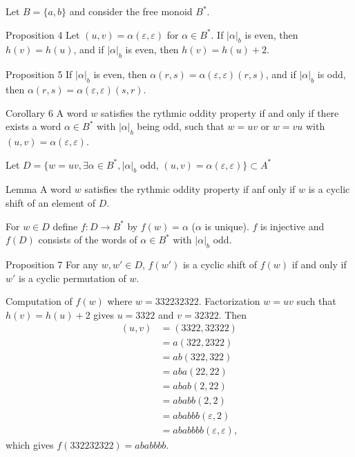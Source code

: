 \documentclass{beamer}
\theoremstyle{definition}
\begin{document}
\begin{frame}
Let $B=\{a,b\}$ and consider the free monoid $B^*$. 

\begin{block}{Proposition 4}
Let $(u,v)=\alpha(\varepsilon,\varepsilon)$ for $\alpha\in B^*$. If $|\alpha|_b$ is even, then $h(v)=h(u)$, and if $|\alpha|_b$ is even, then $h(v)=h(u)+2$. 
\end{block}
\begin{block}{Proposition 5}
If $|\alpha|_b$ is even, then $\alpha(r,s)=\alpha(\varepsilon,\varepsilon)(r,s)$, and if $|\alpha|_b$ is odd, then $\alpha(r,s)=\alpha(\varepsilon,\varepsilon)(s,r)$.
\end{block}

{
\begin{block}{Corollary 6}
A word $w$ satisfies the rythmic oddity property if and only if there exists a word $\alpha\in B^*$ with $|\alpha|_b$ being odd, such that $w=uv$ or $w=vu$ with $(u,v)=\alpha(\varepsilon,\varepsilon)$.
\end{block}
}
\end{frame}
\begin{frame}
Let $D=\{w=uv, \exists\alpha\in B^*, |\alpha|_b$ odd, $(u,v)=\alpha(\varepsilon,\varepsilon)\}\subset A^*$

\begin{block}{Lemma}
A word $w$ satisfies the rythmic oddity property if anf only if $w$ is a cyclic shift of an element of $D$. 
\end{block} 

For $w\in D$ define $f:D\to B^*$ by $f(w)=\alpha$ ($\alpha$ is unique). $f$ is injective and $f(D)$ consists of the words of $\alpha\in B^*$ with $|\alpha|_b$ odd. 

\begin{block}{Proposition 7}
For any $w,w'\in D$, $f(w')$ is a cyclic shift of $f(w)$ if and only if $w'$ is a cyclic permutation of $w$.
\end{block}
\end{frame}

\begin{frame}
\begin{example}
Computation of $f(w)$ where $w=332232322$. Factorization $w=uv$ such that $h(v)=h(u)+2$ gives $u=3322$ and $v=32322$. Then 
\begin{align*}
(u, v) &= (3322, 32322)\\
&= a(322, 2322)\\
&= ab(322, 322)\\
&= aba(22, 22)\\
&= abab(2, 22)\\
&= ababb(2, 2)\\
&= ababbb(\varepsilon, 2)\\
&= ababbbb(\varepsilon, \varepsilon),
\end{align*}
which gives $f(332232322)= ababbbb$.
\end{example}
\end{frame}
\end{document}
